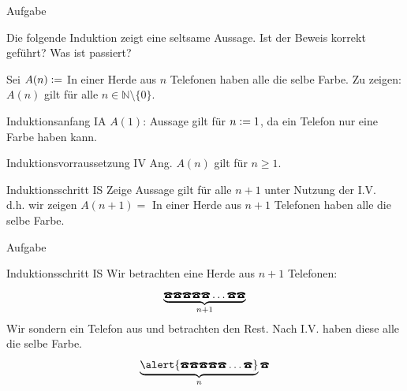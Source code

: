 %
%
%
%

{
	\begin{frame}[fragile]{Aufgabe}
		\begin{alertblock}{Die folgende Induktion zeigt eine seltsame Aussage.}
			Ist der Beweis korrekt geführt? Was ist passiert?
		\end{alertblock}
		Sei $A(n)\vcentcolon=$ In einer Herde aus $n$ Telefonen haben alle die selbe Farbe.
		Zu zeigen: $A(n)$ gilt für alle $n \in \mathbb{N} \setminus \{0\} $.
		\begin{alertblock}{Induktionsanfang IA}
			$A(1)$: Aussage gilt für $n\vcentcolon= 1$, da ein Telefon nur eine Farbe haben kann.
		\end{alertblock}
		\begin{alertblock}{Induktionsvorraussetzung IV}
			Ang. $A(n)$ gilt für $n\geq1$.
		\end{alertblock}
		\begin{alertblock}{Induktionsschritt IS}
			Zeige Aussage gilt für alle $n+1$ unter Nutzung der I.V.\\
			d.h. wir zeigen $A(n+1)=$ In einer Herde aus $n+1$ Telefonen haben alle die selbe Farbe.
		\end{alertblock}
	\end{frame}
	\begin{frame}[fragile]{Aufgabe}
		\footnotesize{
			\begin{alertblock}{Induktionsschritt IS}
				Wir betrachten eine Herde aus $n+1$ Telefonen:
				\[\underbrace{\text{\Telefon}\text{\Telefon}\text{\Telefon}\text{\Telefon}\text{\Telefon}\dots\text{\Telefon}\text{\Telefon}}_{n+1}\]
				Wir sondern ein Telefon aus und betrachten den Rest. Nach I.V. haben diese alle die selbe Farbe.
				\[\underbrace{\alert{\text{\Telefon}\text{\Telefon}\text{\Telefon}\text{\Telefon}\text{\Telefon}\dots\text{\Telefon}}}_{n}\text{\Telefon}\]

\end{alertblock}}
\end{frame}}
